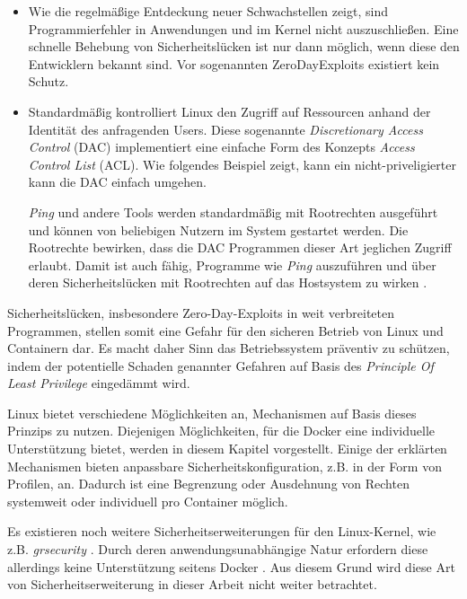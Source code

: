 \documentclass[../main.tex]{subfiles}
\begin{document}
		\begin{itemize}
			\item	Wie die regelmäßige Entdeckung neuer Schwachstellen zeigt, sind Programmierfehler in Anwendungen und im Kernel nicht auszuschließen. Eine schnelle Behebung von Sicherheitslücken ist nur dann möglich, wenn diese den Entwicklern bekannt sind. Vor sogenannten \glspl{ZeroDayExploit} existiert kein Schutz.
			\item	Standardmäßig kontrolliert Linux den Zugriff auf Ressourcen anhand der Identität des anfragenden Users. Diese sogenannte \emph{Discretionary Access Control} (\acrshort{DAC}) implementiert eine einfache Form des Konzepts \emph{Access Control List} (\acrshort{ACL}). Wie folgendes Beispiel zeigt, kann ein nicht-priveligierter \cbroken{} kann die DAC einfach umgehen.

			\emph{Ping} und andere Tools werden standardmäßig mit Rootrechten ausgeführt und können von beliebigen Nutzern im System gestartet werden. Die Rootrechte bewirken, dass die DAC Programmen dieser Art jeglichen Zugriff erlaubt. Damit ist auch \cbroken{} fähig, Programme wie \emph{Ping} auszuführen und über deren Sicherheitslücken mit Rootrechten auf das Hostsystem zu wirken \cite[S.26]{SELinuxApparmor}.
		\end{itemize}

		Sicherheitslücken, insbesondere Zero-Day-Exploits in weit verbreiteten Programmen, stellen somit eine Gefahr für den sicheren Betrieb von Linux und Containern dar. Es macht daher Sinn das Betriebssystem präventiv zu schützen, indem der potentielle Schaden genannter Gefahren auf Basis des \emph{Principle Of Least Privilege} eingedämmt wird.

		Linux bietet verschiedene Möglichkeiten an, Mechanismen auf Basis dieses Prinzips zu nutzen. Diejenigen Möglichkeiten, für die Docker eine individuelle Unterstützung bietet, werden in diesem Kapitel vorgestellt. Einige der erklärten Mechanismen bieten anpassbare Sicherheitskonfiguration, z.B. in der Form von Profilen, an. Dadurch ist eine Begrenzung oder Ausdehnung von Rechten systemweit oder individuell pro Container möglich.

		Es existieren noch weitere Sicherheitserweiterungen für den Linux-Kernel, wie z.B. \emph{grsecurity} \cite{grsecurity}. Durch deren anwendungsunabhängige Natur erfordern diese allerdings keine Unterstützung seitens Docker \cite{dockerSecurity}. Aus diesem Grund wird diese Art von Sicherheitserweiterung in dieser Arbeit nicht weiter betrachtet.
\end{document}
